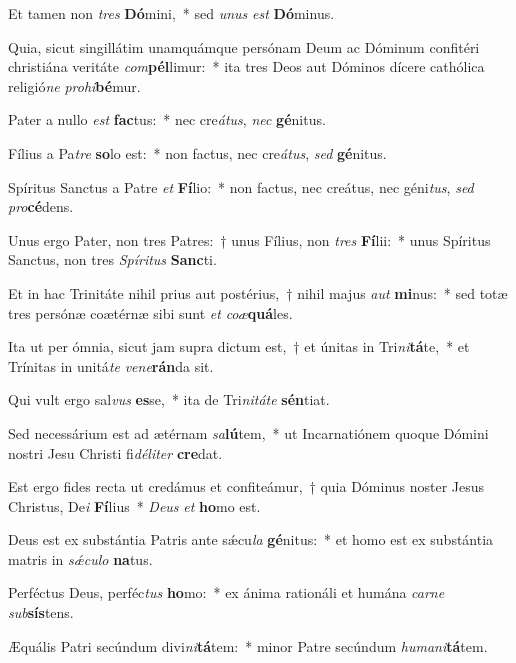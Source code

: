 \item Et tamen non \textit{tres} \textbf{Dó}mini,~* sed \textit{u}\textit{nus} \textit{est} \textbf{Dó}minus.
\item Quia, sicut singillátim unamquámque persónam Deum ac Dóminum confitéri christiána veritáte \textit{com}\textbf{pél}limur:~* ita tres Deos aut Dóminos dícere cathólica religió\textit{ne} \textit{pro}\textit{hi}\textbf{bé}mur.
\item Pater a nullo \textit{est} \textbf{fac}tus:~* nec cre\textit{á}\textit{tus}, \textit{nec} \textbf{gé}nitus.
\item Fílius a Pa\textit{tre} \textbf{so}lo est:~* non factus, nec cre\textit{á}\textit{tus}, \textit{sed} \textbf{gé}nitus.
\item Spíritus Sanctus a Patre \textit{et} \textbf{Fí}lio:~* non factus, nec creátus, nec géni\textit{tus}, \textit{sed} \textit{pro}\textbf{cé}dens.
\item Unus ergo Pater, non tres Patres:~† unus Fílius, non \textit{tres} \textbf{Fí}lii:~* unus Spíritus Sanctus, non tres \textit{Spí}\textit{ri}\textit{tus} \textbf{Sanc}ti.
\item Et in hac Trinitáte nihil prius aut postérius,~† nihil majus \textit{aut} \textbf{mi}nus:~* sed totæ tres persónæ coætérnæ sibi sunt \textit{et} \textit{co}\textit{æ}\textbf{quá}les.
\item Ita ut per ómnia, sicut jam supra dictum est,~† et únitas in Tri\textit{ni}\textbf{tá}te,~* et Trínitas in unitá\textit{te} \textit{ve}\textit{ne}\textbf{rán}da sit.
\item Qui vult ergo sal\textit{vus} \textbf{es}se,~* ita de Tri\textit{ni}\textit{tá}\textit{te} \textbf{sén}tiat.
\item Sed necessárium est ad ætérnam \textit{sa}\textbf{lú}tem,~* ut Incarnatiónem quoque Dómini nostri Jesu Christi fi\textit{dé}\textit{li}\textit{ter} \textbf{cre}dat.
\item Est ergo fides recta ut credámus et confiteámur,~† quia Dóminus noster Jesus Christus, De\textit{i} \textbf{Fí}lius~* \textit{De}\textit{us} \textit{et} \textbf{ho}mo est.
\item Deus est ex substántia Patris ante sǽcu\textit{la} \textbf{gé}nitus:~* et homo est ex substántia matris in \textit{sǽ}\textit{cu}\textit{lo} \textbf{na}tus.
\item Perféctus Deus, perféc\textit{tus} \textbf{ho}mo:~* ex ánima rationáli et humána \textit{car}\textit{ne} \textit{sub}\textbf{sís}tens.
\item Æquális Patri secúndum divi\textit{ni}\textbf{tá}tem:~* minor Patre secúndum \textit{hu}\textit{ma}\textit{ni}\textbf{tá}tem.
